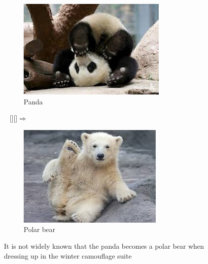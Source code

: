 \begin{figure}
        \centering
        \begin{subfigure}[b]{0.4\textwidth}
                \centering        %
                \includegraphics[trim=0.3cm 0cm 0cm 0cm, clip=true, 
                                width=\linewidth]
                                {Files/panda.jpg}
                \caption{Panda}
                \label{subfig: ff}
        \end{subfigure}
        ~ %
        \raisebox{3cm}[\height][\depth]{$\Rightarrow$}
        \hspace{0.2mm} %
        \begin{subfigure}[b]{0.4\textwidth}
                \centering
                \includegraphics[trim=0cm 0cm 0cm 0cm, clip=true, 
                                width=\linewidth]
                                {Files/polarbear.jpg}
                \caption{Polar bear}
                \label{subfig: sf}
        \end{subfigure}
        \caption[The panda-polar bear relationship ]
                {It is not widely known that the panda becomes a polar bear 
                when dressing up in the winter camouflage suite \cite{AnExpert}}
        \label{fig: pentagram}
\end{figure}




